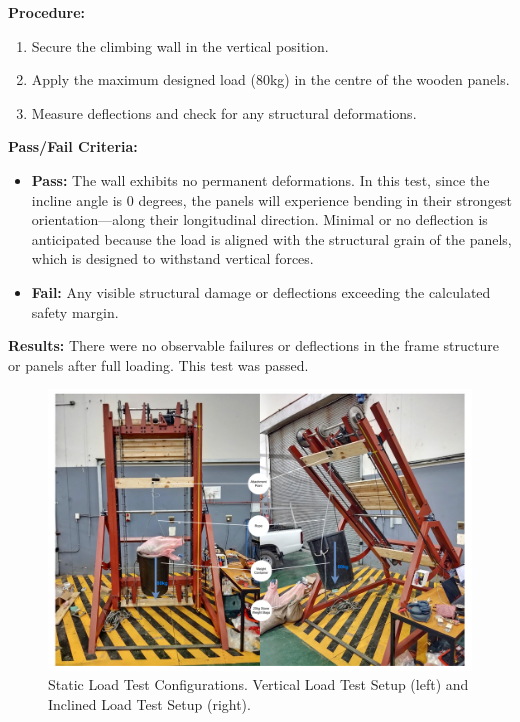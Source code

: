 \textbf{Procedure:}
\begin{enumerate}
    \item Secure the climbing wall in the vertical position.
    \item Apply the maximum designed load (80kg) in the centre of the wooden panels.
    \item Measure deflections and check for any structural deformations.
\end{enumerate}

\textbf{Pass/Fail Criteria:}
\begin{itemize}
    \item \textbf{Pass:} The wall exhibits no permanent deformations. In this test, since the incline angle is 0 degrees, the panels will experience bending in their strongest orientation—along their longitudinal direction. Minimal or no deflection is anticipated because the load is aligned with the structural grain of the panels, which is designed to withstand vertical forces.
    \item \textbf{Fail:} Any visible structural damage or deflections exceeding the calculated safety margin.
\end{itemize}
\noindent
\textbf{Results:} There were no observable failures or deflections in the frame structure or panels after full loading. This test was passed.


\begin{figure}[htbp]
    \centering
    \includegraphics[width=1\textwidth]{figs/testing/load_tests.pdf}
    \caption{Static Load Test Configurations. Vertical Load Test Setup (left) and Inclined Load Test Setup (right).}
    \label{fig:static_load_test_configurations}
\end{figure}

